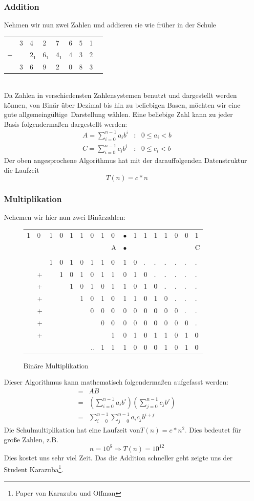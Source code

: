 \documentclass[a4paper,twoside,10pt]{report}
\begin{document}
\subsubsection{Addition}
Nehmen wir nun zwei Zahlen und addieren sie wie früher in der Schule\\
\begin{tabular}{lllllllll}
&3&4&2&7&6&5&1\\
+& &$2_1$&$6_1$&$4_1$&4&3&2\\\hline
&3&6&9&2&0&8&3
\end{tabular}\\
Da Zahlen in verschiedensten Zahlensystemen benutzt und dargestellt werden können, von Binär über Dezimal bis hin zu beliebigen Basen, möch\-ten wir eine gute allgemeingültige\, Darstellung wählen.
Eine beliebige Zahl kann zu jeder Basis folgendermaßen dargestellt werden:
\begin{align*}
A=\sum_{i=0}^{n-1} a_i b^i &:& 0\le a_i<b\\
C=\sum_{i=0}^{n-1} c_i b^i &:& 0\le c_i<b
\end{align*}
Der oben angesprochene Algorithmus hat mit der darauffolgenden Datenstruktur die Laufzeit $$T(n)=c*n$$
\subsubsection{Multiplikation}
Nehemen wir hier nun zwei Binärzahlen: \\[.5em]
\begin{figure}[H]\center\begin{tabular}{l@{ }l@{ }l@{ }l@{ }l@{ }l@{ }l@{ }l@{ }l@{ }l@{ }l@{ }l@{ }l@{ }l@{ }l@{ }l@{ }l}
1&0&1&0&1&1&0&1&0&$\bullet$&1&1&1&1&0&0&1\\
&&&&&&&&A&$\bullet$&&&&&&&C\\
\\
&&1&0&1&0&1&1&0&1&0&.&.&.&.&.&.\\
&+&&1&0&1&0&1&1&0&1&0&.&.&.&.&.\\
&+&&&1&0&1&0&1&1&0&1&0&.&.&.&.\\
&+&&&&1&0&1&0&1&1&0&1&0&.&.&.\\
&+&&&&&0&0&0&0&0&0&0&0&0&.&.\\
&+&&&&&&0&0&0&0&0&0&0&0&0&.\\
&+&&&&&&&1&0&1&0&1&1&0&1&0\\\hline
&&&&&&..&1&1&1&0&0&0&1&0&1&0
\end{tabular}
\caption{Binäre Multiplikation}
\end{figure}
Dieser Algorithmus kann mathematisch folgendermaßen aufgefasst werden:
\begin{align*}
=&AB\\=&\left(\sum_{i=0}^{n-1} a_i b^i\right)\left(\sum_{j=0}^{n-1} c_j b^j\right)\\=&\sum_{i=0}^{n-1}\sum_{j=0}^{n-1}  a_i c_j b^{i+j}
\end{align*}
Die Schulmultiplikation hat eine Laufzeit von\linebreak $T(n)=c*n^2$. Dies bedeutet für große Zahlen, z.B. $$n=10^6 \Rightarrow T(n)=10^{12}$$
Dies kostet uns sehr viel Zeit. Das die Addition schneller geht zeigte uns der Student Karazuba\footnote{Paper von Karazuba und Offman}.
\end{document}
